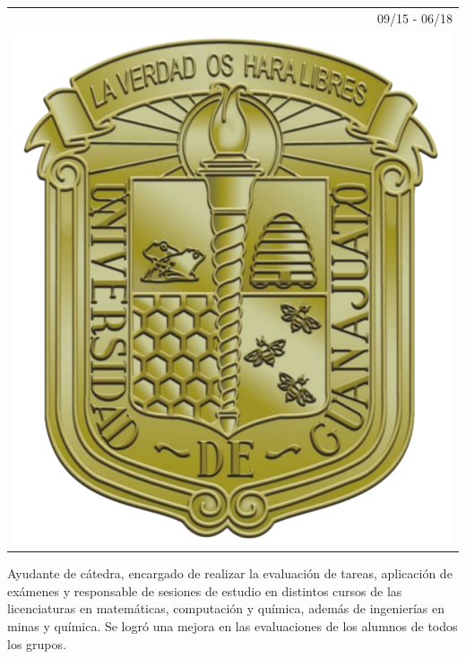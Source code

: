 \documentclass[]{friggeri-cv}
\begin{document}
\begin{entrylist}
  \entry
    {   \begin{tabular}{r}
    		09/15 - 06/18\\
     		\hspace{0.9cm}\includegraphics[scale=0.5]{img/UGTO.png}
	\end{tabular}
    }
    {\vspace{-1.51cm}}
    { }
    {Ayudante de cátedra, encargado de realizar la evaluación de tareas, aplicación de exámenes y responsable de sesiones de estudio en distintos cursos de las licenciaturas en matemáticas, computación y química, además de ingenierías en minas y química. Se logró una mejora en las evaluaciones de los alumnos de todos los grupos.}
\end{entrylist}
    \newpage
\end{document}
